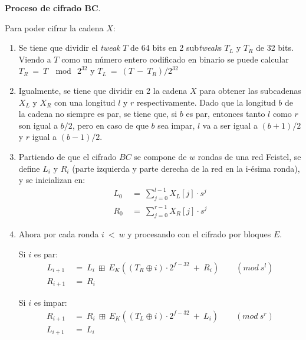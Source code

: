 
\textbf{Proceso de cifrado BC}.

Para poder cifrar la cadena $X$:

\begin{enumerate}

  \item Se tiene que dividir el \textit{tweak} $T$ de 64 bits en 2
    sub\textit{tweak}s $T_L$ y $T_R$ de 32 bits. Viendo a $T$ como un número
    entero codificado en binario se puede calcular $T_R\: =\: T\: \mod\: 2^{32}$
    y $T_L\: =\: (T\: -\: T_R) / 2^{32}$

  \item Igualmente, se tiene que dividir en 2 la cadena $X$ para obtener las
    subcadenas $X_L$ y $X_R$ con una longitud $l$ y $r$ respectivamente.
    Dado que la longitud $b$ de la cadena no siempre es par, se tiene que, si
    $b$ es par, entonces tanto $l$ como $r$ son igual a $b/2$, pero en caso
    de que $b$ sea impar, $l$ va a ser igual a $(b+1)/2$ y $r$ igual a
    $(b-1)/2$.

  \item Partiendo de que el cifrado $BC$ se compone de $w$ rondas de una red
    Feistel, se define $L_i$ y $R_i$ (parte izquierda y parte derecha de la
    red en la i-ésima ronda), y se inicializan en:
    \begin{align}
      L_0\: &=\: \sum_{j=0}^{l-1} X_L[j] \cdot s^j \\
      R_0\: &=\: \sum_{j=0}^{r-1} X_R[j] \cdot s^j
    \end{align}

  \item Ahora por cada ronda $i\: <\: w$ y procesando con el cifrado por
    bloques $E$.

    Si $i$ es par:
    \begin{align}
      L_{i+1}\: &=\: L_i\: \boxplus\:
                    E_K((T_R \oplus i) \cdot 2^{f-32}\: +\: R_i)\qquad
                    (mod\ s^l) \\
      R_{i+1}\: &=\: R_i
    \end{align}

    Si $i$ es impar:
    \begin{align}
      R_{i+1}\: &=\: R_i\: \boxplus\:
                    E_K((T_L \oplus i) \cdot 2^{f-32}\: +\: L_i)\qquad
                    (mod\ s^r) \\
      L_{i+1}\: &=\: L_i
    \end{align}


\end{enumerate}
